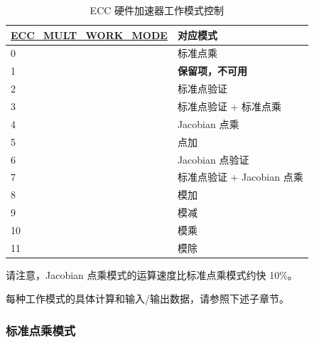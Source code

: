 \documentclass[main\_\_CN.tex]{subfiles}
\begin{document}
\begin{table}[H]
    \centering
    \caption{ECC 硬件加速器工作模式控制}
    \label{tab:ecc-work-mode}
    \begin{tabular}{|l|l|}
    \hline
        \rowcolor{lightgray}
        \textbf{\hyperref[fielddesc:ECCMULTWORKMODE]{ECC\_MULT\_WORK\_MODE}} & \textbf{对应模式}  \\ \hline
        0  & 标准点乘                          \\\hline
        1  & \textbf{保留项，不可用}                \\\hline
        2  & 标准点验证                   \\\hline
        3  & 标准点验证 + 标准点乘            \\\hline
        4  & Jacobian 点乘                \\\hline
        5  & 点加                       \\\hline
        6  & Jacobian 点验证                  \\\hline
        7  & 标准点验证 + Jacobian 点乘        \\\hline
        8  & 模加                       \\\hline
        9  & 模减                     \\\hline
        10 & 模乘                  \\\hline
        11 & 模除                         \\\hline
    \end{tabular}
\end{table}


\begin{tiplisting}
请注意，Jacobian 点乘模式的运算速度比标准点乘模式约快 10\%。
\end{tiplisting}


每种工作模式的具体计算和输入/输出数据，请参照下述子章节。

\subsubsection{标准点乘模式}
\end{document}
